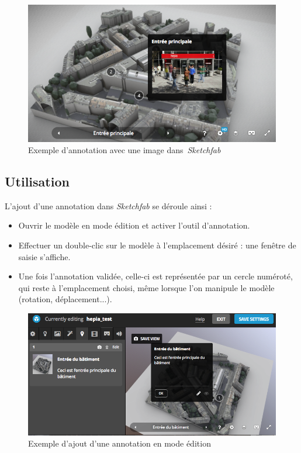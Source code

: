 \begin{figure}
    \centering
    \includegraphics[width=0.9\linewidth]{Figures/sketchfab-annotation-with-picture.png}
    \caption{Exemple d'annotation avec une image dans~\textit{Sketchfab}}
    \label{fig:sketchfab-annotation-with-picture}
\end{figure}

\subsection{Utilisation}

L'ajout d'une annotation dans \textit{Sketchfab} se déroule ainsi : 
\begin{itemize}
    \item Ouvrir le modèle en mode édition et activer l'outil d'annotation.
    \item Effectuer un double-clic sur le modèle à l'emplacement désiré : une fenêtre de saisie s'affiche.
    \item Une fois l'annotation validée, celle-ci est représentée par un cercle numéroté, qui reste à l'emplacement choisi, même lorsque l'on manipule le modèle (rotation, déplacement...).
\end{itemize}

\begin{figure}[h]
    \centering
    \includegraphics[width=0.9\linewidth]{Figures/sketchfab-adding-annotation.png}
    \caption{Exemple d'ajout d'une annotation en mode édition}
    \label{fig:sketchfab-adding-annotation}
\end{figure}


